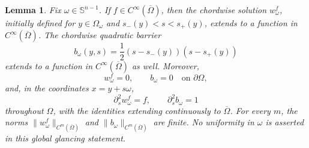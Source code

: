 \documentclass[11pt]{article}
\numberwithin{equation}{section}
\newtheorem{lemma}[theorem]{Lemma}
\newcommand{\Sn}{\mathbb S^{n-1}}
\begin{document}
\begin{lemma}\label{lem:global-glancing-smoothness}
Fix \(\omega\in\Sn\).  If \(f\in C^\infty(\overline\Omega)\), then the chordwise solution \(w_\omega^f\), initially defined for \(y\in\Omega_\omega\) and \(s_-(y)<s<s_+(y)\), extends to a function in \(C^\infty(\overline\Omega)\).  The chordwise quadratic barrier
\[
    b_\omega(y,s)=\frac12(s-s_-(y))(s-s_+(y))
\]
extends to a function in \(C^\infty(\overline\Omega)\) as well.  Moreover,
\[
    w_\omega^f=0,
    \qquad
    b_\omega=0
    \quad\text{on }\partial\Omega,
\]
and, in the coordinates \(x=y+s\omega\),
\[
    \partial_s^2w_\omega^f=f,
    \qquad
    \partial_s^2b_\omega=1
\]
throughout \(\Omega\), with the identities extending continuously to \(\overline\Omega\).  For every \(m\), the norms \(\|w_\omega^f\|_{C^m(\overline\Omega)}\) and \(\|b_\omega\|_{C^m(\overline\Omega)}\) are finite.  No uniformity in \(\omega\) is asserted in this global glancing statement.
\end{lemma}
\end{document}
